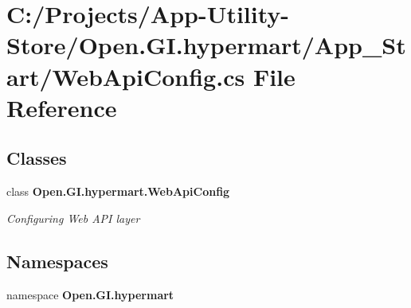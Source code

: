 \section{C\+:/\+Projects/\+App-\/\+Utility-\/\+Store/\+Open.G\+I.\+hypermart/\+App\+\_\+\+Start/\+Web\+Api\+Config.cs File Reference}
\label{_web_api_config_8cs}
\subsection*{Classes}
\begin{DoxyCompactItemize}
\item 
class {\bfseries Open.\+G\+I.\+hypermart.\+Web\+Api\+Config}
\begin{DoxyCompactList}\small\item\em Configuring Web A\+PI layer \end{DoxyCompactList}\end{DoxyCompactItemize}
\subsection*{Namespaces}
\begin{DoxyCompactItemize}
\item 
namespace \textbf{ Open.\+G\+I.\+hypermart}
\end{DoxyCompactItemize}
